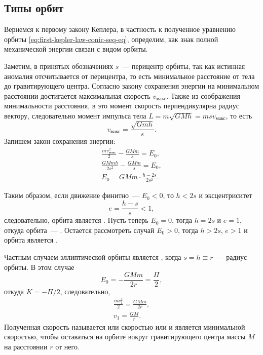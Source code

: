 \subsection{Типы орбит}
\label{sec:orbit-types}

Вернемся к первому закону Кеплера, в частность к полученное уравнению орбиты \eqref{eq:first-kepler-law-conic-seq-eq}, определим, как знак полной механической энергии связан с видом орбиты. 

Заметим, в принятых обозначениях $s$~--- перицентр орбиты, так как истинная аномалия отсчитывается от перицентра, то есть минимальное расстояние от тела до гравитирующего центра. Согласно закону сохранения энергии на минимальном расстоянии достигается максимальная скорость $v_\text{макс}$. Также из соображения минимальности расстояния, в это момент скорость перпендикулярна радиус вектору, следовательно момент импульса тела $L = m\sqrt{GMh} =  m s v_\text{макс}$, то есть
 \begin{equation*}
     v_\text{макс} = \frac{\sqrt{Gmh}}{s}.
 \end{equation*}
 Запишем закон сохранения энергии:
 \begin{gather*}
     \frac{m v_\text{макс}^2}{2} - \frac{GMm}{s} = E_0,\\
     \frac{GMmh}{2s^2} - \frac{GMm}{s} = E_0,\\
     E_0 = GMm \cdot \frac{h - 2s}{2s^2}.
 \end{gather*}
 
 Таким образом, если движение финитно~--- $E_0 < 0$, то $h < 2s$ и эксцентриситет
 \begin{equation*}
     e = \frac{h-s}{s} < 1,
 \end{equation*}
 следовательно, орбита является . Пусть теперь $E_0=0$, тогда $h = 2s$ и $e = 1$, откуда орбита~--- . Остается рассмотреть случай $E_0 > 0$, тогда $h > 2s$, $e > 1$ и орбита является .
 
 Частным случаем эллиптической орбиты является , когда $s = h \equiv r$~--- радиус орбиты. В этом случае 
 \begin{equation*}
     E_0 = -\frac{GMm}{2r} = \frac{\Pi}{2},
 \end{equation*}
 откуда $K = - \Pi / 2$, следовательно,
 \begin{gather}
     \frac{m v_1^2}{2} = \frac{GMm}{2r}, \nonumber \\
     v_1 = \frac{GM}{r}.
     \label{eq:circle-speed}
 \end{gather} 
 Полученная скорость называется  или  скоростью или и является минимальной скоростью, чтобы оставаться на орбите вокруг гравитирующего центра массы $M$ на расстоянии $r$ от него.
 
 